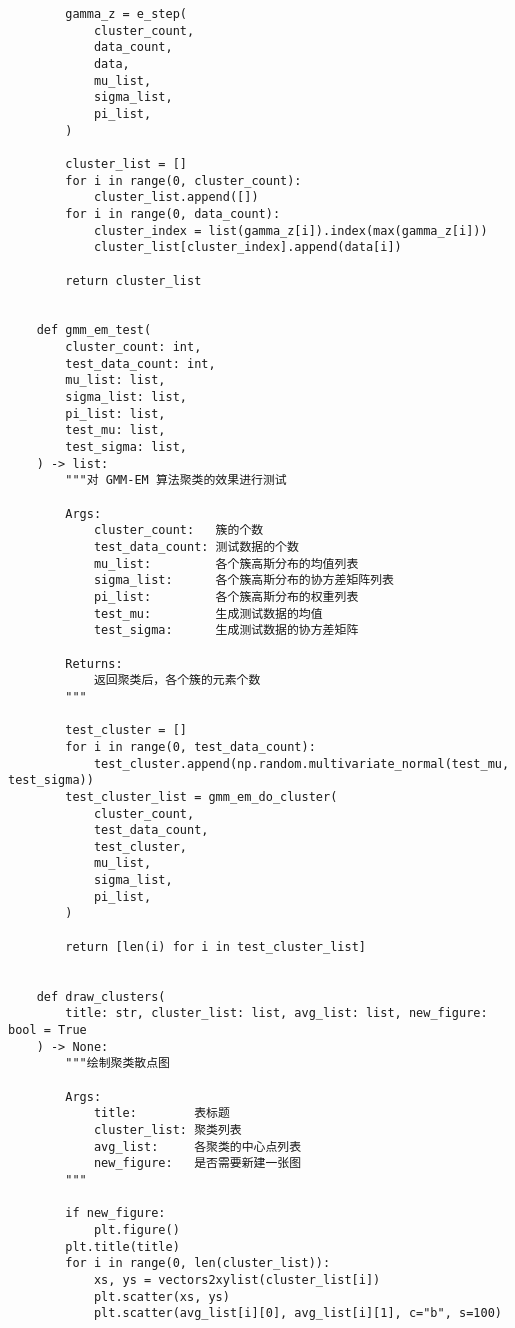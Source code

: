 \begin{verbatim}
        gamma_z = e_step(
            cluster_count,
            data_count,
            data,
            mu_list,
            sigma_list,
            pi_list,
        )

        cluster_list = []
        for i in range(0, cluster_count):
            cluster_list.append([])
        for i in range(0, data_count):
            cluster_index = list(gamma_z[i]).index(max(gamma_z[i]))
            cluster_list[cluster_index].append(data[i])

        return cluster_list


    def gmm_em_test(
        cluster_count: int,
        test_data_count: int,
        mu_list: list,
        sigma_list: list,
        pi_list: list,
        test_mu: list,
        test_sigma: list,
    ) -> list:
        """对 GMM-EM 算法聚类的效果进行测试

        Args:
            cluster_count:   簇的个数
            test_data_count: 测试数据的个数
            mu_list:         各个簇高斯分布的均值列表
            sigma_list:      各个簇高斯分布的协方差矩阵列表
            pi_list:         各个簇高斯分布的权重列表
            test_mu:         生成测试数据的均值
            test_sigma:      生成测试数据的协方差矩阵

        Returns:
            返回聚类后，各个簇的元素个数
        """

        test_cluster = []
        for i in range(0, test_data_count):
            test_cluster.append(np.random.multivariate_normal(test_mu, test_sigma))
        test_cluster_list = gmm_em_do_cluster(
            cluster_count,
            test_data_count,
            test_cluster,
            mu_list,
            sigma_list,
            pi_list,
        )

        return [len(i) for i in test_cluster_list]


    def draw_clusters(
        title: str, cluster_list: list, avg_list: list, new_figure: bool = True
    ) -> None:
        """绘制聚类散点图

        Args:
            title:        表标题
            cluster_list: 聚类列表
            avg_list:     各聚类的中心点列表
            new_figure:   是否需要新建一张图
        """

        if new_figure:
            plt.figure()
        plt.title(title)
        for i in range(0, len(cluster_list)):
            xs, ys = vectors2xylist(cluster_list[i])
            plt.scatter(xs, ys)
            plt.scatter(avg_list[i][0], avg_list[i][1], c="b", s=100)



\end{verbatim}
